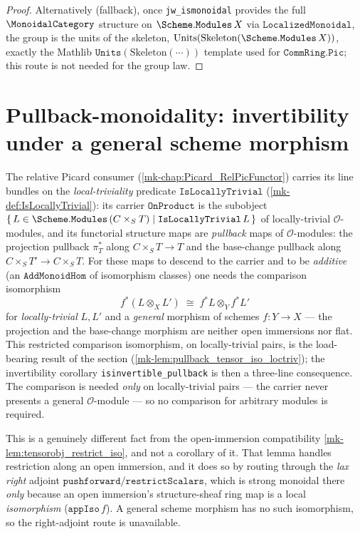 \begin{proof}
  Alternatively (fallback), once \texttt{jw\_ismonoidal} provides the full
  \(\MonoidalCategory\) structure on \(\Scheme.\mathtt{Modules}\,X\) via
  \(\mathtt{LocalizedMonoidal}\), the group is the units of the skeleton,
  \(\mathrm{Units}(\mathrm{Skeleton}(\Scheme.\mathtt{Modules}\,X))\), exactly the
  Mathlib \(\mathtt{Units}(\mathrm{Skeleton}(\cdots))\) template used for
  \(\mathtt{CommRing.Pic}\); this route is not needed for the group law.
\end{proof}

\section{Pullback-monoidality: invertibility under a general scheme morphism}
\label{mk-sec:tensorobj_pullback_monoidality}

The relative Picard consumer (\ref{mk-chap:Picard_RelPicFunctor}) carries its line
bundles on the \emph{local-triviality} predicate \(\mathtt{IsLocallyTrivial}\)
(\ref{mk-def:IsLocallyTrivial}): its carrier \(\mathtt{OnProduct}\) is the
subobject \(\{\,L \in \Scheme.\mathtt{Modules}\,(C \times_S T) \mid
\mathtt{IsLocallyTrivial}\,L\,\}\) of locally-trivial \(\mathcal{O}\)-modules, and
its functorial structure maps are \emph{pullback} maps of \(\mathcal{O}\)-modules:
the projection pullback \(\pi_T^*\) along \(C \times_S T \to T\) and the
base-change pullback along \(C \times_S T' \to C \times_S T\). For these maps to
descend to the carrier and to be \emph{additive} (an \(\mathtt{AddMonoidHom}\) of
isomorphism classes) one needs the comparison isomorphism
\[
  f^*(L \otimes_X L')
    \;\cong\;
  f^*L \otimes_Y f^*L'
\]
for \emph{locally-trivial} \(L, L'\) and a \emph{general} morphism of schemes
\(f : Y \to X\) --- the projection and the base-change morphism are neither open
immersions nor flat. This restricted comparison isomorphism, on locally-trivial
pairs, is the load-bearing result of the section
(\ref{mk-lem:pullback_tensor_iso_loctriv}); the invertibility corollary
\texttt{isinvertible\_pullback} is then a three-line consequence. The comparison
is needed \emph{only} on locally-trivial pairs --- the carrier never presents a
general \(\mathcal{O}\)-module --- so no comparison for arbitrary modules is
required.

This is a genuinely different fact from the open-immersion compatibility
\ref{mk-lem:tensorobj_restrict_iso}, and not a corollary of it. That lemma handles
restriction along an open immersion, and it does so by routing through the
\emph{lax right} adjoint \(\mathtt{pushforward}/\mathtt{restrictScalars}\), which is
strong monoidal there \emph{only} because an open immersion's structure-sheaf ring
map is a local \emph{isomorphism} (\(\mathtt{appIso}\,f\)). A general scheme
morphism has no such isomorphism, so the right-adjoint route is unavailable.

